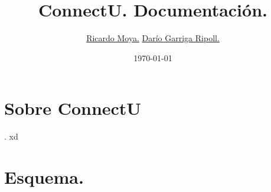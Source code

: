 \documentclass[12pt]{article}
\begin{document}
  \title{ConnectU. Documentaci\'{o}n.}
  \author{
    \href{https://github.com/Onelio}{Ricardo Moya.}
    \href{https://github.com/dgrr}{Dar\'{i}o Garriga Ripoll.}
  }
  \date{\today}
  \maketitle
  \tableofcontents
  \newpage

  \section{Sobre ConnectU}.
    xd
  \section{Esquema.}
\end{document}
